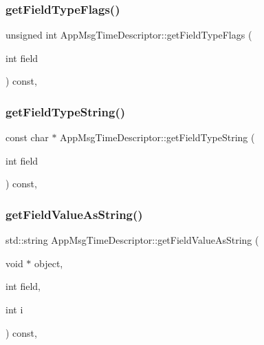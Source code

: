 \subsubsection{\texorpdfstring{get\+Field\+Type\+Flags()}{getFieldTypeFlags()}}
{\footnotesize\ttfamily unsigned int App\+Msg\+Time\+Descriptor\+::get\+Field\+Type\+Flags (\begin{DoxyParamCaption}\item[{int}]{field }\end{DoxyParamCaption}) const\hspace{0.3cm}{\ttfamily [override]}, {\ttfamily [virtual]}}

\mbox{\label{classAppMsgTimeDescriptor_a576cceeffd841b561c7c8f9bb92fff85}} 
\subsubsection{\texorpdfstring{get\+Field\+Type\+String()}{getFieldTypeString()}}
{\footnotesize\ttfamily const char $\ast$ App\+Msg\+Time\+Descriptor\+::get\+Field\+Type\+String (\begin{DoxyParamCaption}\item[{int}]{field }\end{DoxyParamCaption}) const\hspace{0.3cm}{\ttfamily [override]}, {\ttfamily [virtual]}}

\mbox{\label{classAppMsgTimeDescriptor_adfd92cca9d3fdd2705e303d1f5121c07}} 
\subsubsection{\texorpdfstring{get\+Field\+Value\+As\+String()}{getFieldValueAsString()}}
{\footnotesize\ttfamily std\+::string App\+Msg\+Time\+Descriptor\+::get\+Field\+Value\+As\+String (\begin{DoxyParamCaption}\item[{void $\ast$}]{object,  }\item[{int}]{field,  }\item[{int}]{i }\end{DoxyParamCaption}) const\hspace{0.3cm}{\ttfamily [override]}, {\ttfamily [virtual]}}

